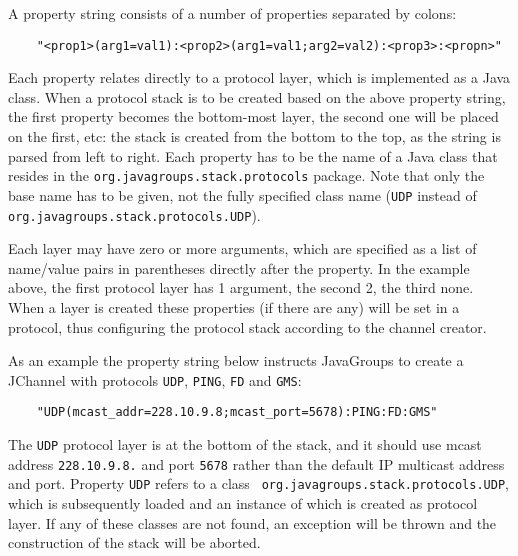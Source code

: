     A property string consists of a number of properties separated by colons:

    \begin{small}
    \begin{verbatim}
    "<prop1>(arg1=val1):<prop2>(arg1=val1;arg2=val2):<prop3>:<propn>"
    \end{verbatim}
    \end{small}

    Each property relates directly to a protocol layer, which is implemented as a
    Java class. When a protocol stack is to be created based on the above property
    string, the first property becomes the bottom-most layer, the second one will be
    placed on the first, etc: the stack is created from the bottom to the top, as the
    string is parsed from left to right. Each property has to be the name of a Java
    class that resides in the {\tt org.javagroups.stack.protocols} package. Note that
    only the base name has to be given, not the fully specified class name ({\tt UDP}
    instead of {\tt org.javagroups.stack.protocols.UDP}).

    Each layer may have zero or more arguments, which are specified as a list of
    name/value pairs in parentheses directly after the property. In the example
    above, the first protocol layer has 1 argument, the second 2, the third
    none. When a layer is created these properties (if there are any) will be set in
    a protocol, thus configuring the protocol stack according to the channel creator.

    As an example the property string below instructs JavaGroups to create a
    JChannel with protocols {\tt UDP}, {\tt PING}, {\tt FD} and {\tt GMS}:


    \begin{small}
    \begin{verbatim}
    "UDP(mcast_addr=228.10.9.8;mcast_port=5678):PING:FD:GMS"
    \end{verbatim}
    \end{small}

    The {\tt UDP} protocol layer is at the bottom of the stack, and it should use
    mcast address {\tt 228.10.9.8.} and port {\tt 5678} rather than the default IP
    multicast address and port. Property {\tt UDP} refers to a class {\tt
    org.javagroups.stack.protocols.UDP}, which is subsequently loaded and an instance
    of which is created as protocol layer. If any of these classes are not found, an
    exception will be thrown and the construction of the stack will be aborted.

